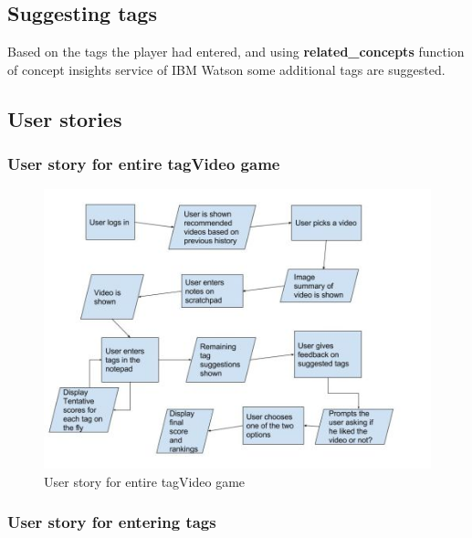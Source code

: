 \documentclass[12pt]{article}
\begin{document}
\subsection{Suggesting tags}
Based on the tags the player had entered, and using \textbf{related\_concepts} function of concept insights service of IBM Watson some additional tags are suggested.
  

\newpage
\subsection{User stories}
\subsubsection{User story for entire tagVideo game}



\begin{figure}[h]
\begin{center}
\includegraphics{images/userstory2_mod.jpg}
\caption{User story for entire tagVideo game}
\label{User story for entire tagVideo game}
\end{center}
\end{figure}

\newpage
\subsubsection{User story for entering tags}
\end{document}
